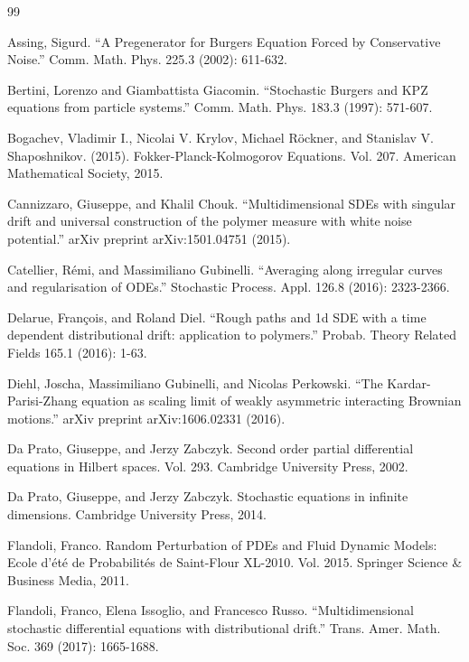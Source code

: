 \documentclass[a4paper,11pt]{article}
\newcommand{\1}{\mathds{1}}
\begin{document}
\begin{thebibliography}{99}

     Assing, Sigurd. ``A Pregenerator for Burgers Equation Forced by Conservative Noise.'' Comm. Math. Phys. 225.3 (2002): 611-632.

    Bertini, Lorenzo and Giambattista Giacomin. ``Stochastic Burgers and KPZ equations from particle systems.'' Comm. Math. Phys. 183.3 (1997): 571-607.

     Bogachev, Vladimir I., Nicolai V. Krylov, Michael R\"ockner, and Stanislav V. Shaposhnikov. (2015). Fokker-Planck-Kolmogorov Equations. Vol. 207. American Mathematical Society, 2015.

    Cannizzaro, Giuseppe, and Khalil Chouk. ``Multidimensional SDEs with singular drift and universal construction of the polymer measure with white noise potential.'' arXiv preprint arXiv:1501.04751 (2015).
    
     Catellier, R\'emi, and Massimiliano Gubinelli. ``Averaging along irregular curves and regularisation of ODEs.'' Stochastic Process. Appl. 126.8 (2016): 2323-2366.

     Delarue, Fran\c cois, and Roland Diel. ``Rough paths and 1d SDE with a time dependent distributional drift: application to polymers.'' Probab. Theory  Related Fields 165.1 (2016): 1-63.
     
    Diehl, Joscha, Massimiliano Gubinelli, and Nicolas Perkowski. ``The Kardar-Parisi-Zhang equation as scaling limit of weakly asymmetric interacting Brownian motions.'' arXiv preprint arXiv:1606.02331 (2016).

      Da Prato, Giuseppe, and Jerzy Zabczyk. Second order partial differential equations in Hilbert spaces. Vol. 293. Cambridge University Press, 2002.

      Da Prato, Giuseppe, and Jerzy Zabczyk. Stochastic equations in infinite dimensions. Cambridge University Press, 2014.
      
       Flandoli, Franco. Random Perturbation of PDEs and Fluid Dynamic Models: Ecole d'\'et\'e de Probabilit\'es de Saint-Flour XL-2010. Vol. 2015. Springer Science \& Business Media, 2011.

     Flandoli, Franco, Elena Issoglio, and Francesco Russo. ``Multidimensional stochastic differential equations with distributional drift.'' Trans. Amer. Math. Soc. 369 (2017): 1665-1688.


\end{thebibliography}
\end{document}
